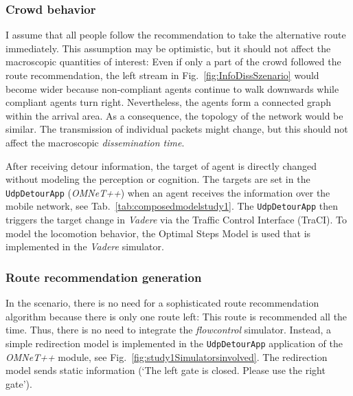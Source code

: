 \subsubsection{Crowd behavior}
I assume that all people follow the recommendation to take the alternative route immediately. This assumption may be optimistic, but it should not affect the macroscopic quantities of interest: Even if only a part of the crowd followed the route recommendation, the left stream in Fig.~\ref{fig:InfoDissSzenario} would become wider because non-compliant agents continue to walk downwards while compliant agents turn right.
Nevertheless, the agents form a connected graph within the arrival area. As a consequence, the topology of the network would be similar.  The transmission of individual packets might change, but this should not affect the macroscopic \textit{dissemination time}.
 

After receiving detour information, the target of agent is directly changed without modeling the perception or cognition. The targets are set in the \lstinline{UdpDetourApp} (\textit{OMNeT++}) when an agent receives the information over the mobile network, see Tab.~\ref{tab:composedmodelstudy1}. The \lstinline{UdpDetourApp} then triggers the target change in \textit{Vadere} via the Traffic Control Interface (TraCI). 
To model the locomotion behavior, the Optimal Steps Model is used that is implemented in the  \textit{Vadere} simulator.



\subsubsection{Route recommendation generation}
In the scenario, there is no need for a sophisticated route recommendation algorithm because there is only one route left: This route is recommended all the time. Thus, there is no need to integrate the \textit{flowcontrol} simulator. Instead, a simple redirection model is implemented in the \lstinline{UdpDetourApp} application of the \textit{OMNeT++} module, see Fig.~\ref{fig:study1Simulatorsinvolved}. The redirection model sends static information (`The left gate is closed. Please use the right gate').


